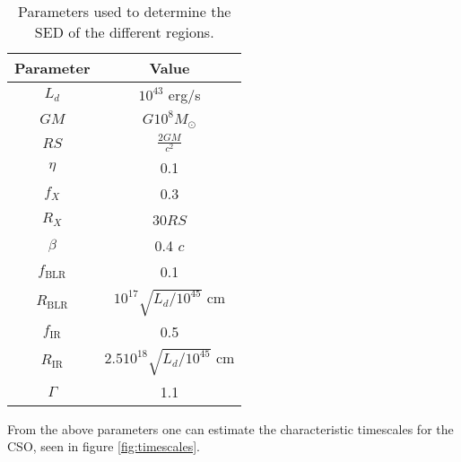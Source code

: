 \begin{table}
    \centering
    \begin{tabular}{|c|c|}
        \hline
        Parameter & Value \\
        \hline
        $L_{d}$ & $10^{43}$ erg/s \\
        $GM$ & $G 10^{8} M_{\odot}$ \\
        $RS$ & $\frac{2GM}{c^2}$ \\
        $\eta$ & 0.1 \\
        $f_{X}$ & 0.3 \\
        $R_{X}$ & 30$ RS $\\
        $\beta$ & 0.4 $c$\\
        $f_{\text{BLR}}$ & 0.1 \\
        $R_{\text{BLR}}$ & $10^{17} \sqrt{L_{d}/10^{45}}$ cm \\
        $f_{\text{IR}}$ & 0.5 \\
        $R_{\text{IR}}$ & $2.5 10^{18}\sqrt{L_{d}/10^{45}}$ cm \\
        $\Gamma$ & 1.1 \\
        \hline
    \end{tabular}
    \caption{Parameters used to determine the SED of the different regions.}
    \label{tab:SED_params}
\end{table}


From the above parameters one can estimate the characteristic timescales for the CSO, seen in figure \ref{fig:timescales}. 

